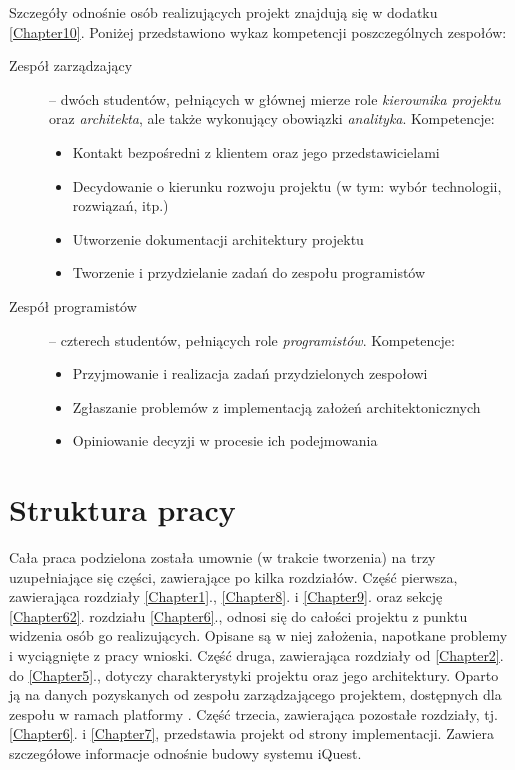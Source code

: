 Szczegóły odnośnie osób realizujących projekt znajdują się w dodatku \ref{Chapter10}. Poniżej przedstawiono wykaz kompetencji poszczególnych zespołów:
\begin{description}
\item[Zespół zarządzający] -- dwóch studentów, pełniących w głównej mierze role \emph{kierownika projektu} oraz \emph{architekta}, ale także wykonujący obowiązki \emph{analityka}. Kompetencje:
\begin{itemize}
\item Kontakt bezpośredni z klientem oraz jego przedstawicielami
\item Decydowanie o kierunku rozwoju projektu (w tym: wybór technologii, rozwiązań, itp.)
\item Utworzenie dokumentacji architektury projektu
\item Tworzenie i przydzielanie zadań do zespołu programistów
\end{itemize}
\item[Zespół programistów] -- czterech studentów, pełniących role \emph{programistów}. Kompetencje:
\begin{itemize}
\item Przyjmowanie i realizacja zadań przydzielonych zespołowi
\item Zgłaszanie problemów z implementacją założeń architektonicznych
\item Opiniowanie decyzji w procesie ich podejmowania
\end{itemize}
\end{description}

\section{Struktura pracy}
\label{Chapter15}

Cała praca podzielona została umownie (w trakcie tworzenia) na trzy uzupełniające się części, zawierające po kilka rozdziałów. Część pierwsza, zawierająca rozdziały \ref{Chapter1}., \ref{Chapter8}. i \ref{Chapter9}. oraz sekcję \ref{Chapter62}. rozdziału \ref{Chapter6}., odnosi się do całości projektu z punktu widzenia osób go realizujących. Opisane są w niej założenia, napotkane problemy i wyciągnięte z pracy wnioski. Część druga, zawierająca rozdziały od \ref{Chapter2}. do \ref{Chapter5}., dotyczy charakterystyki projektu oraz jego architektury. Oparto ją na danych pozyskanych od zespołu zarządzającego projektem\cite{Redmine:ProjDocs}, dostępnych dla zespołu w ramach platformy . Część trzecia, zawierająca pozostałe rozdziały, tj. \ref{Chapter6}. i \ref{Chapter7}, przedstawia projekt od strony implementacji. Zawiera szczegółowe informacje odnośnie budowy systemu iQuest.